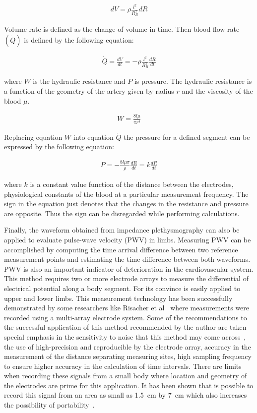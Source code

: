 \begin{align}
\label{eq:dvdr}
dV = \rho \frac{l^2}{R^2_B} dR
\end{align}

Volume rate is defined as the change of volume in time. Then blood flow rate $(\dot{Q})$ is defined by the following equation:

\begin{align}
\dot{Q} = \frac{dV}{dt}=-\rho \frac{l^2}{R^{2}_{B}} \frac{dR}{dt}
\end{align}

where $W$ is the hydraulic resistance and $P$ is pressure. The hydraulic resistance is a function of the geometry of the artery given by radius $r$ and the viscosity of the blood $\mu$.

\begin{align}
W=\frac{8 l \mu}{\pi r^4}
\end{align}

Replacing equation $W$ into equation $\dot{Q}$ the pressure for a defined segment can be expressed by the following equation:

\begin{align}
P = -\frac{8 l \mu \pi}{\rho} \frac{dR}{dt} = k \frac{dR}{dt}
\end{align}

where $k$ is a constant value function of the distance between the electrodes, physiological constants of the blood at a particular measurement frequency. The sign in the equation just denotes that the changes in the resistance and pressure are opposite. Thus the sign can be disregarded while performing calculations.

Finally, the waveform obtained from impedance plethysmography can also be applied to evaluate pulse-wave velocity (PWV) in limbs. Measuring PWV can be accomplished by computing the time arrival difference between two reference measurement points and estimating the time difference between both waveforms. PWV is also an important indicator of deterioration in the cardiovascular system. This method requires two or more electrode arrays to measure the differential of electrical potential along a body segment. For its convince is easily applied to upper and lower limbs. This measurement technology has been successfully demonstrated by some researchers like Risacher et al~\cite{risacher1993impedance} where measurements were recorded using a multi-array electrode system. Some of the recommendations to the successful application of this method recommended by the author are taken special emphasis in the sensitivity to noise that this method may come across~\cite{risacher1992computation}, the use of high-precision and reproducible by the electrode array, accuracy in the measurement of the distance separating measuring sites, high sampling frequency to ensure higher accuracy in the calculation of time intervals. There are limits when recording these signals from a small body where location and geometry of the electrodes are prime for this application. It has been shown that is possible to record this signal from an area as small as \SI{1.5}{\cm} by \SI{7}{\cm} which also increases the possibility of portability~\cite{cho2009bio}. 

